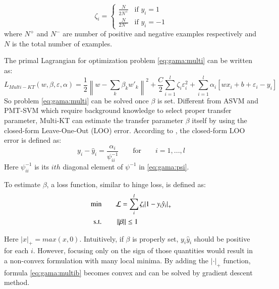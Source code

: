 \begin{equation*}
{\zeta _i} = \left\{ {\begin{array}{*{20}{c}}
{\frac{N}{{2{N^ + }}}}&{{\text{if }}{y_i} =1}\\
{\frac{N}{{2{N^ - }}}}&{{\text{if }}{y_i} =- 1}
\end{array}} \right.
\end{equation*}
where $N^+$ and $N^-$ are number of positive and negative examples respectively and $N$ is the total number of examples. 

The primal Lagrangian for optimization problem \eqref{eq:gama:multi} can be written as:
\begin{equation}
{L_{Multi - KT}}\left( {w,\beta ,\varepsilon ,\alpha } \right) = \frac{1}{2}{\left\| {w - \sum\limits_k {{\beta _k}} {{w'}_k}} \right\|^2} + \frac{C}{2}\sum\limits_{i = 1}^l {{\zeta _i}\varepsilon _i^2}  + \sum\limits_{i = 1}^l {{\alpha _i}\left[ {w{x_i} + b + {\varepsilon _i} - {y_i}} \right]} 
\end{equation}
So problem \eqref{eq:gama:multi} can be solved once $\beta$ is set.
Different from ASVM and PMT-SVM which require background knowledge to select proper transfer parameter, Multi-KT can estimate the transfer parameter $\beta$ itself by using the closed-form Leave-One-Out (LOO) error. According to \cite{cawley2006leave}, the closed-form LOO error is defined as:
\begin{equation}\label{eq:gama:loo}
{y_{i}} - {\hat y_{i}} = \frac{{{\alpha _{i}}}}{{\psi_{ii}^{ - 1}}}{\qquad\text{for}}\qquad i = 1,...,l
\end{equation}
Here $\psi_{ii}^{-1}$ is its $ith$ diagonal element of $\psi^{-1}$ in \eqref{eq:gama:psi}.

To estimate $\beta$, a loss function, similar to hinge loss, is defined as: 
\begin{equation}\label{eq:gama:multib}
\begin{aligned}
\text{min} \qquad&{\cal L} = \sum\limits_i^l {{\zeta _i}{{\left| {1 - {y_i}{{\hat y}_i}} \right|}_ + }} \\
\text{s.t.} \qquad& \left\| \beta  \right\| \le 1
\end{aligned}
\end{equation}

Here $|x|_+=max(x,0)$. Intuitively, if $\beta$ is properly set, ${y_i}{{\hat y}_i}$ should be positive for each $i$. However, focusing only on the sign of those quantities would result in a non-convex formulation with many local minima. By adding the $|\cdot|_+$ function, formula \eqref{eq:gama:multib} becomes convex and can be solved by gradient descent method.

